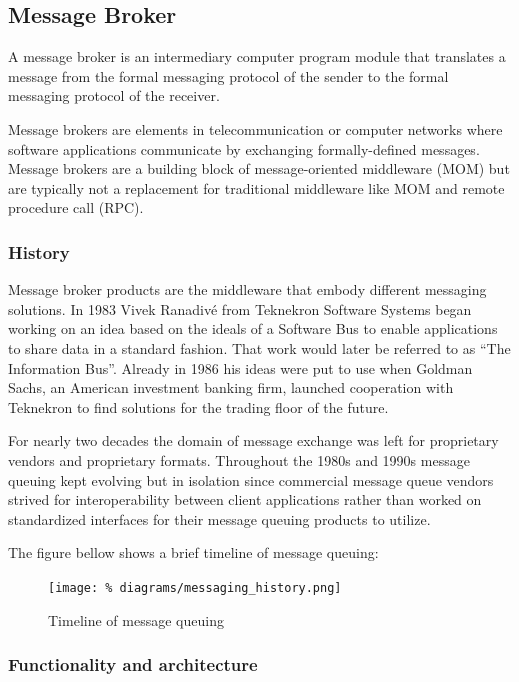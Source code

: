 \subsection{Message Broker}
\label{s_message_broker}

A message broker is an intermediary computer program module
that translates a message from the formal messaging
protocol of the sender to the formal messaging protocol of
the receiver.

Message brokers are elements in telecommunication or
computer networks where software applications communicate
by exchanging formally-defined messages. Message brokers
are a building block of message-oriented middleware (MOM)
but are typically not a replacement for traditional
middleware like MOM and remote procedure call (RPC).
\cite{amjad27}

\subsubsection{History}

Message broker products are the middleware that embody
different messaging solutions. In 1983 Vivek Ranadivé from
Teknekron Software Systems began working on an idea based
on the ideals of a Software Bus to enable applications to
share data in a standard fashion. That work would later be
referred to as “The Information Bus”. Already in 1986 his
ideas were put to use when Goldman Sachs, an American
investment banking firm, launched cooperation with
Teknekron to find solutions for the trading floor of the
future.\cite{amjad28}

For nearly two decades the domain of message exchange was
left for proprietary vendors and proprietary formats.
Throughout the 1980s and 1990s message queuing kept
evolving but in isolation since commercial message queue
vendors strived for interoperability between client
applications rather than worked on standardized interfaces
for their message queuing products to utilize.
\cite{amjad28}


The figure bellow shows a brief timeline of message queuing:

\begin{figure}[H]
  \centering
  \texttt{[image: \%
    diagrams/messaging\_history.png]}
  \caption{Timeline of message queuing}
\end{figure}

\subsubsection{Functionality and architecture}

